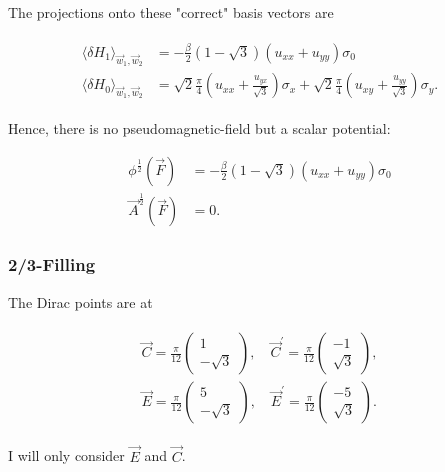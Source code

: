 \documentclass[../../../main.tex]{subfiles}
\begin{document}
The projections onto these "correct" basis vectors are 

\begin{align}
	\begin{split}
		\langle \delta H_1 \rangle_{\vec{w}_1, \vec{w}_2} &= -\frac{\beta}{2}(1-\sqrt{3})(u_{xx}+u_{yy})\sigma_0 \\
		\langle \delta H_0 \rangle_{\vec{w}_1, \vec{w}_2} &= \sqrt{2}\frac{\pi}{4}\left(u_{xx} + \frac{u_{yx}}{\sqrt{3}}\right)\sigma_x + \sqrt{2}\frac{\pi}{4}\left(u_{xy} + \frac{u_{yy}}{\sqrt{3}}\right)\sigma_y.
	\end{split}
\end{align}

Hence, there is no pseudomagnetic-field but a scalar potential:

\begin{align}
	\phi^{\frac12}(\vec{F}) &= -\frac{\beta}{2}(1-\sqrt{3})(u_{xx}+u_{yy})\sigma_0 \\
	\vec{A}^{\frac12}(\vec{F}) &= 0.
\end{align}

\subsubsection{2/3-Filling}

The Dirac points are at 

\begin{gather}
	\begin{split}
		\vec{C} = \frac{\pi}{12}
		\begin{pmatrix}
			1 \\
			-\sqrt{3}
		\end{pmatrix}, \quad 
		\vec{C}^\prime = \frac{\pi}{12}
		\begin{pmatrix}
			-1 \\
			\sqrt{3}
		\end{pmatrix},\\	
		\vec{E} = \frac{\pi}{12}
		\begin{pmatrix}
			5 \\
			-\sqrt{3}
		\end{pmatrix}, \quad
		\vec{E}^\prime = \frac{\pi}{12}
		\begin{pmatrix}
			-5 \\
			\sqrt{3}
		\end{pmatrix}.	
	\end{split}
\end{gather}

I will only consider $\vec{E}$ and $\vec{C}$. \\
\end{document}
